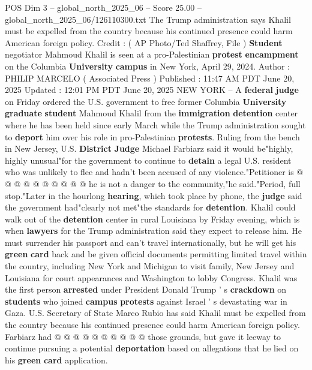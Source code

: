 \begin{textsample}{POS Dim 3 – global\_north\_2025\_06 – Score 25.00 – global\_north\_2025\_06/126110300.txt}  \label{ex:f3_pos_096}
The Trump administration says Khalil must be expelled from the country because his continued presence could harm American foreign policy.
Credit : ( AP Photo/Ted Shaffrey, File ) \textbf{Student} negotiator Mahmoud Khalil is seen at a pro-Palestinian \textbf{protest} \textbf{encampment} on the Columbia \textbf{University} \textbf{campus} in New York, April 29, 2024.
Author : PHILIP MARCELO ( Associated Press ) Published : 11:47 AM PDT June 20, 2025 Updated : 12:01 PM PDT June 20, 2025 NEW YORK -- A \textbf{federal} \textbf{judge} on Friday ordered the U.S. government to free former Columbia \textbf{University} \textbf{graduate} \textbf{student} Mahmoud Khalil from the \textbf{immigration} \textbf{detention} center where he has been held since early March while the Trump administration sought to \textbf{deport} him over his role in pro-Palestinian \textbf{protests}.
Ruling from the bench in New Jersey, U.S. \textbf{District} \textbf{Judge} Michael Farbiarz said it would be"highly, highly unusual"for the government to continue to \textbf{detain} a legal U.S. resident who was unlikely to flee and hadn't been accused of any violence."Petitioner is @ @ @ @ @ @ @ @ @ @ he is not a danger to the community,"he said."Period, full stop."Later in the hourlong \textbf{hearing}, which took place by phone, the \textbf{judge} said the government had"clearly not met"the standards for \textbf{detention}.
Khalil could walk out of the \textbf{detention} center in rural Louisiana by Friday evening, which is when \textbf{lawyers} for the Trump administration said they expect to release him.
He must surrender his passport and can't travel internationally, but he will get his \textbf{green} \textbf{card} back and be given official documents permitting limited travel within the country, including New York and Michigan to visit family, New Jersey and Louisiana for court appearances and Washington to lobby Congress.
Khalil was the first person \textbf{arrested} under President Donald Trump ' s \textbf{crackdown} on \textbf{students} who joined \textbf{campus} \textbf{protests} against Israel ' s devastating war in Gaza.
U.S.
Secretary of State Marco Rubio has said Khalil must be expelled from the country because his continued presence could harm American foreign policy.
Farbiarz had @ @ @ @ @ @ @ @ @ @ those grounds, but gave it leeway to continue pursuing a potential \textbf{deportation} based on allegations that he lied on his \textbf{green} \textbf{card} application.

\end{textsample}
